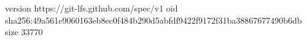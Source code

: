 version https://git-lfs.github.com/spec/v1
oid sha256:49a561e9060163eb8ec0f484b290d5abfdf9422f9172f31ba38867677490b6db
size 33770
